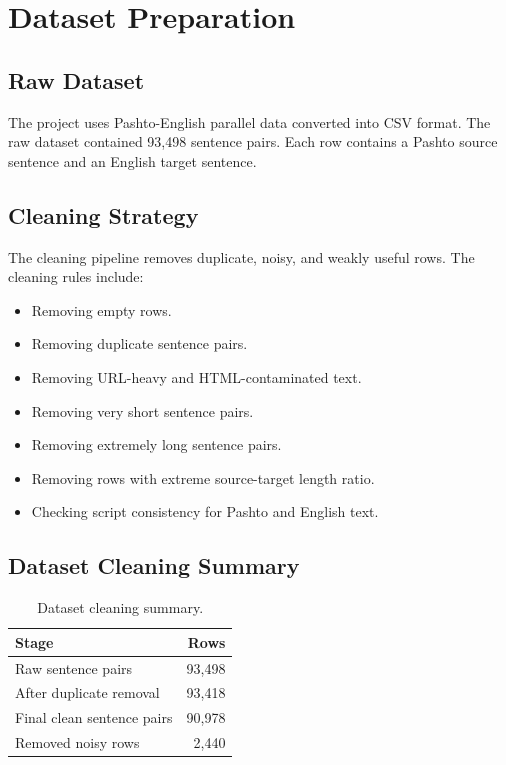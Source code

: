 \documentclass[conference]{IEEEtran}
\begin{document}
\section{Dataset Preparation}

\subsection{Raw Dataset}

The project uses Pashto-English parallel data converted into CSV format. The raw dataset contained 93,498 sentence pairs. Each row contains a Pashto source sentence and an English target sentence.

\subsection{Cleaning Strategy}

The cleaning pipeline removes duplicate, noisy, and weakly useful rows. The cleaning rules include:

\begin{itemize}
    \item Removing empty rows.
    \item Removing duplicate sentence pairs.
    \item Removing URL-heavy and HTML-contaminated text.
    \item Removing very short sentence pairs.
    \item Removing extremely long sentence pairs.
    \item Removing rows with extreme source-target length ratio.
    \item Checking script consistency for Pashto and English text.
\end{itemize}

\subsection{Dataset Cleaning Summary}

\begin{table}[H]
\centering
\caption{Dataset cleaning summary.}
\begin{tabular}{lr}
\toprule
\textbf{Stage} & \textbf{Rows} \\
\midrule
Raw sentence pairs & 93,498 \\
After duplicate removal & 93,418 \\
Final clean sentence pairs & 90,978 \\
Removed noisy rows & 2,440 \\
\bottomrule
\end{tabular}
\end{table}
\end{document}
